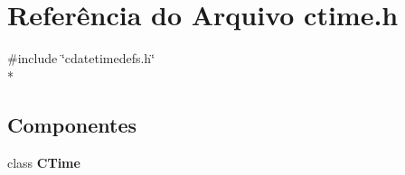\section{Referência do Arquivo ctime.\+h}
\label{ctime_8h}
{\ttfamily \#include \char`\"{}cdatetimedefs.\+h\char`\"{}}\\*
\subsection*{Componentes}
\begin{DoxyCompactItemize}
\item 
class {\bf C\+Time}
\end{DoxyCompactItemize}
